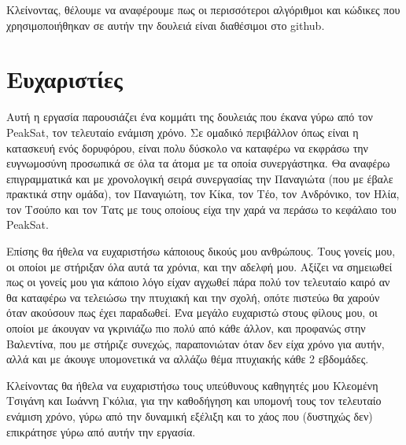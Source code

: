 {Κλείνοντας, θέλουμε να αναφέρουμε πως οι περισσότεροι αλγόριθμοι και κώδικες που χρησιμοποιήθηκαν σε αυτήν την δουλειά είναι διαθέσιμοι στο \textlatin{github}.

 



\chapter*{Ευχαριστίες}
Αυτή η εργασία παρουσιάζει ένα κομμάτι της δουλειάς που έκανα γύρω από τον PeakSat, τον τελευταίο ενάμιση χρόνο. Σε ομαδικό περιβάλλον όπως είναι η κατασκευή ενός δορυφόρου, είναι πολυ δύσκολο να καταφέρω να εκφράσω την ευγνωμοσύνη προσωπικά σε όλα τα άτομα με τα οποία συνεργάστηκα. Θα αναφέρω επιγραμματικά και με χρονολογική σειρά συνεργασίας την Παναγιώτα (που με έβαλε πρακτικά στην ομάδα), τον Παναγιώτη, τον Κίκα, τον Τέο, τον Ανδρόνικο, τον Ηλία, τον Τσούπο και τον Τατς με τους οποίους είχα την χαρά να περάσω το κεφάλαιο του \textlatin{PeakSat}. 


Επίσης θα ήθελα να ευχαριστήσω κάποιους δικούς μου ανθρώπους. Τους γονείς μου, οι οποίοι με στήριξαν όλα αυτά τα χρόνια, και την αδελφή μου. Αξίζει να σημειωθεί πως οι γονείς μου για κάποιο λόγο είχαν αγχωθεί πάρα πολύ τον τελευταίο καιρό αν θα καταφέρω να τελειώσω την πτυχιακή και την σχολή, οπότε πιστεύω θα χαρούν όταν ακούσουν πως έχει παραδωθεί. Ένα μεγάλο ευχαριστώ στους φίλους μου, οι οποίοι με άκουγαν να γκρινιάζω πιο πολύ από κάθε άλλον, και προφανώς στην Βαλεντίνα, που με στήριζε συνεχώς, παραπονιώταν όταν δεν είχα χρόνο για αυτήν, αλλά και με άκουγε υπομονετικά να αλλάζω θέμα πτυχιακής κάθε 2 εβδομάδες. 


Κλείνοντας θα ήθελα να ευχαριστήσω τους υπεύθυνους καθηγητές μου Κλεομένη Τσιγάνη και Ιωάννη Γκόλια, για την καθοδήγηση και υπομονή τους τον τελευταίο ενάμιση χρόνο, γύρω από την δυναμική εξέλιξη και το χάος που (δυστηχώς δεν) επικράτησε γύρω από αυτήν την εργασία. 
}